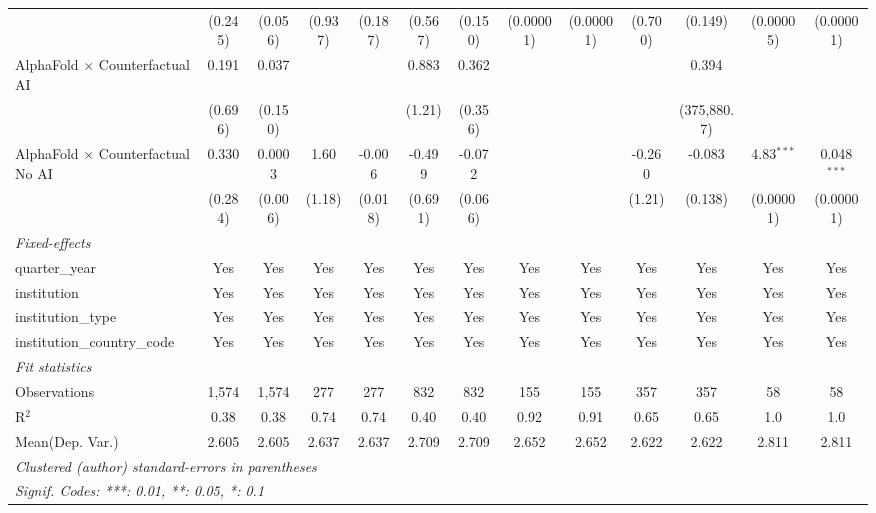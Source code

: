 \begin{tabular}{lcccccccccccc}
                                            & (0.245) & (0.056) & (0.937) & (0.187) & (0.567) & (0.150) & (0.00001)      & (0.00001)      & (0.700) & (0.149)     & (0.00005)      & (0.00001)\\   
   AlphaFold $\times$ Counterfactual AI     & 0.191   & 0.037   &         &         & 0.883   & 0.362   &                &                &         & 0.394       &                &   \\   
                                            & (0.696) & (0.150) &         &         & (1.21)  & (0.356) &                &                &         & (375,880.7) &                &   \\   
   AlphaFold $\times$ Counterfactual No AI  & 0.330   & 0.0003  & 1.60    & -0.006  & -0.499  & -0.072  &                &                & -0.260  & -0.083      & 4.83$^{***}$   & 0.048$^{***}$\\   
                                            & (0.284) & (0.006) & (1.18)  & (0.018) & (0.691) & (0.066) &                &                & (1.21)  & (0.138)     & (0.00001)      & (0.00001)\\   
   \midrule
   \emph{Fixed-effects}\\
   quarter\_year                            & Yes     & Yes     & Yes     & Yes     & Yes     & Yes     & Yes            & Yes            & Yes     & Yes         & Yes            & Yes\\  
   institution                              & Yes     & Yes     & Yes     & Yes     & Yes     & Yes     & Yes            & Yes            & Yes     & Yes         & Yes            & Yes\\  
   institution\_type                        & Yes     & Yes     & Yes     & Yes     & Yes     & Yes     & Yes            & Yes            & Yes     & Yes         & Yes            & Yes\\  
   institution\_country\_code               & Yes     & Yes     & Yes     & Yes     & Yes     & Yes     & Yes            & Yes            & Yes     & Yes         & Yes            & Yes\\  
   \midrule
   \emph{Fit statistics}\\
   Observations                             & 1,574   & 1,574   & 277     & 277     & 832     & 832     & 155            & 155            & 357     & 357         & 58             & 58\\  
   R$^2$                                    & 0.38    & 0.38    & 0.74    & 0.74    & 0.40    & 0.40    & 0.92           & 0.91           & 0.65    & 0.65        & 1.0            & 1.0\\  
Mean(Dep. Var.) & 2.605 & 2.605 & 2.637 & 2.637 & 2.709 & 2.709 & 2.652 & 2.652 & 2.622 & 2.622 & 2.811 & 2.811 \\
   \midrule \midrule
   \multicolumn{13}{l}{\emph{Clustered (author) standard-errors in parentheses}}\\
   \multicolumn{13}{l}{\emph{Signif. Codes: ***: 0.01, **: 0.05, *: 0.1}}\\
\end{tabular}
\par\endgroup
